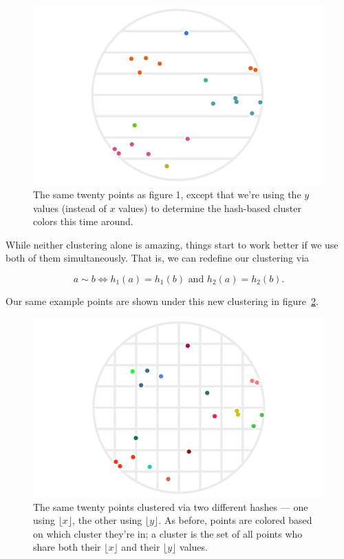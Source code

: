 \documentclass[20pt,]{extarticle}
\begin{document}
\begin{figure}
\centering
\includegraphics{images/lsh_image2.png}
\caption{The same twenty points as figure 1, except that we're using the
\(y\) values (instead of \(x\) values) to determine the hash-based
cluster colors this time around.}\label{fig:fig2}
\end{figure}

While neither clustering alone is amazing, things start to work better
if we use both of them simultaneously. That is, we can redefine our
clustering via

\begin{equation} a \sim b \iff h_1(a) = h_1(b) \text{ and } h_2(a) = h_2(b). \label{eq:eq1}\end{equation}

Our same example points are shown under this new clustering in
figure~\ref{fig:fig3}.

\begin{figure}
\centering
\includegraphics{images/lsh_image3.png}
\caption{The same twenty points clustered via two different hashes ---
one using \(\lfloor x\rfloor\), the other using \(\lfloor y\rfloor.\) As
before, points are colored based on which cluster they're in; a cluster
is the set of all points who share both their \(\lfloor x\rfloor\) and
their \(\lfloor y\rfloor\) values.}\label{fig:fig3}
\end{figure}
\end{document}
